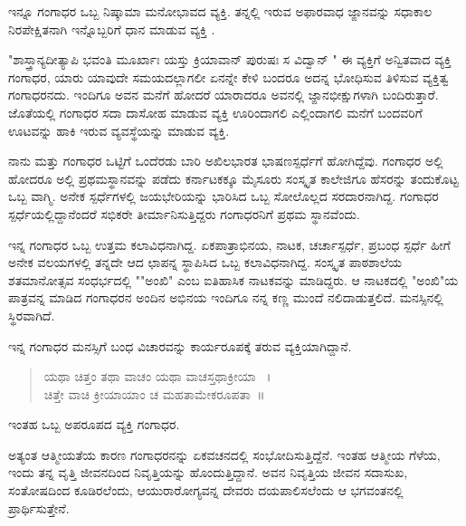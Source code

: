ಇನ್ನೂ ಗಂಗಾಧರ ಒಬ್ಬ ನಿಷ್ಕಾಮಾ ಮನೋಭಾವದ ವ್ಯಕ್ತಿ. ತನ್ನಲ್ಲಿ ಇರುವ ಅಫಾರವಾಧ ಜ್ಙಾನವನ್ನು ಸಧಾಕಾಲ ನಿರಪೇಕ್ಷಿತನಾಗಿ  ಇನ್ನೊಬ್ಬರಿಗೆ ಧಾನ ಮಾಡುವ ವ್ಯಕ್ತಿ .

"ಶಾಸ್ತ್ರಾನ್ಯದೀತ್ಯಾಪಿ ಭವಂತಿ ಮೂರ್ಖಾಃ ಯಸ್ತು ಕ್ರಿಯಾವಾನ್ ಪುರುಷಃ ಸ ವಿದ್ವಾನ್ " ಈ ವ್ಯಕ್ತಿಗೆ ಅನ್ವಿತವಾದ ವ್ಯಕ್ತಿ ಗಂಗಾಧರ, ಯಾರು ಯಾವುದೇ ಸಮಯದಲ್ಲಾಗಲೀ ಏನನ್ನೇ ಕೇಳಿ ಬಂದರೂ  ಅದನ್ನ ಭೋಧಿಸುವ ತಿಳಿಸುವ ವ್ಯಕ್ತಿತ್ವ ಗಂಗಾಧರನದು.  ಇಂದಿಗೂ ಅವನ ಮನೆಗೆ ಹೋದರೆ ಯಾರಾದರೂ  ಅವನಲ್ಲಿ ಜ್ಙಾನಭೀಕ್ಷುಗಳಾಗಿ ಬಂದಿರುತ್ತಾರೆ. ಜೊತೆಯಲ್ಲಿ ಗಂಗಾಧರ ಸದಾ ದಾಸೋಹ ಮಾಡುವ ವ್ಯಕ್ತಿ ಊರಿಂದಾಗಲಿ ಎಲ್ಲಿಂದಾಗಲಿ  ಮನೆಗೆ ಬಂದವರಿಗೆ ಊಟವನ್ನು ಹಾಕಿ ಇರುವ ವ್ಯವಸ್ಥೆಯನ್ನು  ಮಾಡುವ ವ್ಯಕ್ತಿ. 

ನಾನು ಮತ್ತು ಗಂಗಾಧರ ಒಟ್ಟಿಗೆ ಒಂದೆರಡು ಬಾರಿ ಅಖಿಲಭಾರತ ಭಾಷಣಸ್ಪರ್ಧೆಗೆ ಹೋಗಿದ್ದೆವು. ಗಂಗಾಧರ ಅಲ್ಲಿ ಹೋದರೂ ಅಲ್ಲಿ ಪ್ರಥಮಸ್ಥಾನವನ್ನು ಪಡೆದು ಕರ್ನಾಟಕಕ್ಕೂ ಮೈಸೂರು ಸಂಸ್ಕೃತ ಕಾಲೇಜಿಗೂ ಹೆಸರನ್ನು ತಂದುಕೊಟ್ಟ ಒಬ್ಬ ವಾಗ್ಮಿ. ಅನೇಕ ಸ್ಪರ್ಧೆಗಳಲ್ಲಿ ಜಯಭೇರಿಯನ್ನು ಭಾರಿಸಿದ ಒಬ್ಬ ಸೋಲೊಲ್ಲದ ಸರದಾರನಾಗಿದ್ದ. ಗಂಗಾಧರ ಸ್ಪರ್ಧೆಯಲ್ಲಿದ್ದಾನೆಂದರೆ ಸಭಿಕರೇ ತೀರ್ಮಾನಿಸುತ್ತಿದ್ದರು ಗಂಗಾಧರನಿಗೆ ಪ್ರಥಮ ಸ್ಥಾನವೆಂದು. 

ಇನ್ನ ಗಂಗಾಧರ  ಒಬ್ಬ ಉತ್ತಮ ಕಲಾವಿಧನಾಗಿದ್ದ. ಏಕಪಾತ್ರಾಭಿನಯ, ನಾಟಕ, ಚರ್ಚಾಸ್ಪರ್ಧೆ, ಪ್ರಬಂಧ ಸ್ಪರ್ಧೆ ಹೀಗೆ    ಅನೇಕ ವಲಯಗಳಲ್ಲಿ ತನ್ನದೇ ಆದ ಛಾಪನ್ನ ಸ್ಥಾಪಿಸಿದ ಒಬ್ಬ ಕಲಾವಿಧನಾಗಿದ್ದ. ಸಂಸ್ಕೃತ ಪಾಠಶಾಲೆಯ ಶತಮಾನೋತ್ಸವ ಸಂಧರ್ಭದಲ್ಲಿ ""ಅಂಖಿ" ಎಂಬ ಐತಿಹಾಸಿಕ ನಾಟಕವನ್ನು ಮಾಡಿದ್ದರು. ಆ ನಾಟಕದಲ್ಲಿ "ಅಂಖಿ"ಯ ಪಾತ್ರವನ್ನ ಮಾಡಿದ ಗಂಗಾಧರನ ಅಂದಿನ ಅಭಿನಯ ಇಂದಿಗೂ ನನ್ನ ಕಣ್ಣ ಮುಂದೆ ನಲಿದಾಡುತ್ತಲಿದೆ. ಮನಸ್ಸಿನಲ್ಲಿ ಸ್ಥಿರವಾಗಿದೆ.

ಇನ್ನ ಗಂಗಾಧರ ಮನಸ್ಸಿಗೆ ಬಂಧ ವಿಚಾರವನ್ನು ಕಾರ್ಯರೂಪಕ್ಕೆ ತರುವ ವ್ಯಕ್ತಿಯಾಗಿದ್ದಾನೆ.

\begin{verse}
ಯಥಾ ಚಿತ್ತಂ  ತಥಾ ವಾಚಂ ಯಥಾ ವಾಚಸ್ತಥಾಕ್ರೀಯಾ ~।\\
ಚಿತ್ತೇ ವಾಚಿ ಕ್ರೀಯಾಯಾಂ  ಚ ಮಹತಾಮೇಕರೂಪತಾ~॥
\end{verse}

ಇಂತಹ ಒಬ್ಬ ಅಪರೂಪದ ವ್ಯಕ್ತಿ ಗಂಗಾಧರ.        

ಅತ್ಯಂತ ಆತ್ಮೀಯತೆಯ ಕಾರಣ ಗಂಗಾಧರನನ್ನು  ಏಕವಚನದಲ್ಲಿ ಸಂಭೋದಿಸುತ್ತಿದ್ದೆನೆ. ಇಂತಹ ಆತ್ಮೀಯ ಗೆಳೆಯ, ಇಂದು ತನ್ನ ವೃತ್ತಿ ಜೀವನದಿಂದ ನಿವೃತ್ತಿಯನ್ನು ಹೊಂದುತ್ತಿದ್ದಾನೆ. ಅವನ ನಿವೃತ್ತಿಯ ಜೀವನ ಸದಾಸುಖ, ಸಂತೋಷದಿಂದ ಕೂಡಿರಲೆಂದು, ಆಯುರಾರೋಗ್ಯವನ್ನ ದೇವರು ದಯಪಾಲಿಸಲೆಂದು ಆ ಭಗವಂತನಲ್ಲಿ ಪ್ರಾರ್ಥಿಸುತ್ತೇನೆ. 

\articleend									
